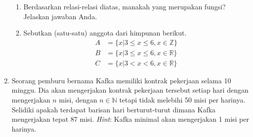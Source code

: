 \documentclass[12pt]{article}
\begin{document}
\begin{enumerate}
\begin{enumerate}
\item Berdasarkan relasi-relasi diatas, manakah yang merupakan fungsi? Jelaskan jawaban Anda.
\item Sebutkan (satu-satu) anggota dari himpunan berikut.
\begin{align*}
A &= \{x|3 \leq x \leq 6, x \in \mathbb{Z}\} \\
B &= \{x|3 \leq x \leq 6, x \in \mathbb{R}\} \\
C &= \{x|3 < x < 6, x \in \mathbb{R}\}
\end{align*}
\end{enumerate}

\item Seorang pemburu bernama Kafka memiliki kontrak pekerjaan selama 10 minggu. Dia akan mengerjakan kontrak pekerjaan tersebut setiap hari dengan mengerjakan $n$ misi, dengan $n \in \mathbb{N}$ tetapi tidak melebihi 50 misi per harinya. Selidiki apakah terdapat barisan hari berturut-turut dimana Kafka mengerjakan tepat 87 misi. \textit{Hint}: Kafka minimal akan mengerjakan 1 misi per harinya.
\end{enumerate}
\end{document}
